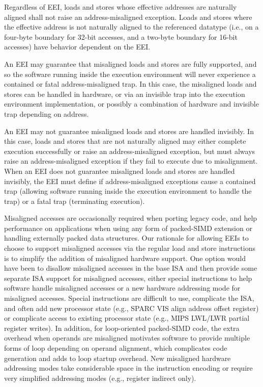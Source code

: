 Regardless of EEI, loads and stores whose effective addresses are
naturally aligned shall not raise an address-misaligned exception.
Loads and stores where the effective address is not naturally aligned
to the referenced datatype (i.e., on a four-byte boundary for 32-bit
accesses, and a two-byte boundary for 16-bit accesses) have behavior
dependent on the EEI.

An EEI may guarantee that misaligned loads and stores are fully
supported, and so the software running inside the execution
environment will never experience a contained or fatal
address-misaligned trap.  In this case, the misaligned loads and
stores can be handled in hardware, or via an invisible trap into the
execution environment implementation, or possibly a combination of
hardware and invisible trap depending on address.

An EEI may not guarantee misaligned loads and stores are handled
invisibly.  In this case, loads and stores that are not naturally
aligned may either complete execution successfully or raise an
address-misaligned exception, but must always raise an
address-misaligned exception if they fail to execute due to
misalignment.  When an EEI does not guarantee misaligned loads and
stores are handled invisibly, the EEI must define if
address-misaligned exceptions cause a contained trap (allowing
software running inside the execution environment to handle the trap)
or a fatal trap (terminating execution).

\begin{commentary}
Misaligned accesses are occasionally required when porting legacy
code, and help performance on applications when using any form of
packed-SIMD extension or handling externally packed data structures.
Our rationale for allowing EEIs to choose to support misaligned
accesses via the regular load and store instructions is to simplify
the addition of misaligned hardware support.  One option would have
been to disallow misaligned accesses in the base ISA and then provide
some separate ISA support for misaligned accesses, either special
instructions to help software handle misaligned accesses or a new
hardware addressing mode for misaligned accesses.  Special
instructions are difficult to use, complicate the ISA, and often add
new processor state (e.g., SPARC VIS align address offset register) or
complicate access to existing processor state (e.g., MIPS LWL/LWR
partial register writes).  In addition, for loop-oriented packed-SIMD
code, the extra overhead when operands are misaligned motivates
software to provide multiple forms of loop depending on operand
alignment, which complicates code generation and adds to loop startup
overhead.  New misaligned hardware addressing modes take considerable
space in the instruction encoding or require very simplified
addressing modes (e.g., register indirect only).
\end{commentary}

